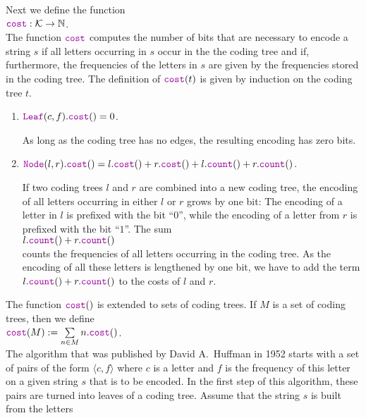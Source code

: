 Next we define the function
\\[0.2cm]
\hspace*{1.3cm}
$\mytt{cost}: \mathcal{K} \rightarrow \N$.
\\[0.2cm]
The function $\mytt{cost}$ computes the number of bits that are necessary to encode a string $s$ if 
all letters occurring in $s$ occur in the the coding tree and if, furthermore, the frequencies of the letters
in $s$ are given by the frequencies stored in the coding tree.
The definition of $\mytt{cost}(t)$ is given by induction on the coding tree $t$.
\begin{enumerate}
\item $\mytt{Leaf}(c,f).\mytt{cost}() = 0$.

      As long as the coding tree has no edges, the resulting encoding has zero bits.
\item $\mytt{Node}(l,r).\mytt{cost}() = 
       l.\mytt{cost}() + r.\mytt{cost}() + l.\mytt{count}() + r.\mytt{count}()$.

      If two coding trees $l$ and $r$ are combined into a new coding tree, the encoding of all letters
      occurring in either $l$ or $r$ grows by one bit:  The encoding of a letter in $l$ is prefixed with the
      bit ``$0$'', while the encoding of a letter from $r$ is prefixed with the bit ``$1$''.  The sum
      \\[0.2cm]
      \hspace*{1.3cm}
      $l.\mytt{count}() + r.\mytt{count}()$
      \\[0.2cm] 
      counts the frequencies of all letters occurring in the coding tree.
      As the encoding of all these letters is lengthened by one bit,
      we have to add the term $l.\mytt{count}() + r.\mytt{count}()$ to the costs of $l$ and $r$.
\end{enumerate}
The function  $\mytt{cost}()$ is extended to sets of coding trees.  If $M$ is a set of coding trees, then we
define
\\[0.2cm]
\hspace*{1.3cm}
$\mytt{cost}(M) := \sum\limits_{n\in M} n.\mytt{cost}()$. 
\\[0.2cm]
The algorithm that was published by David A.~Huffman in 1952 \cite{huffman:52} starts with a set of pairs of
the form $\langle c, f\rangle$ where $c$ is a letter and $f$ is the frequency of this letter on a given string
$s$ that is to be encoded.  In the first step of this algorithm, these pairs are turned into leaves of a coding tree.
Assume that the string $s$ is built from the  letters
